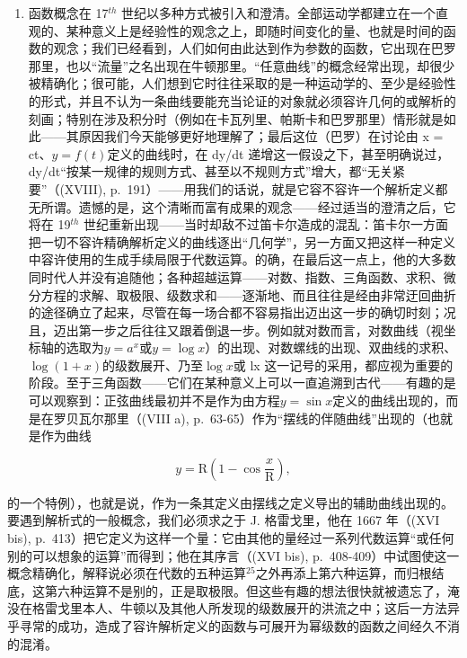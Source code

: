 \begin{enumerate}
\def\labelenumi{\Alph{enumi})}
\setcounter{enumi}{6}
\tightlist
\item
  函数概念在 17\(^{th}\) 世纪以多种方式被引入和澄清。全部运动学都建立在一个直观的、某种意义上是经验性的观念之上，即随时间变化的量、也就是时间的函数的观念；我们已经看到，人们如何由此达到作为参数的函数，它出现在巴罗那里，也以“流量”之名出现在牛顿那里。“任意曲线”的概念经常出现，却很少被精确化；很可能，人们想到它时往往采取的是一种运动学的、至少是经验性的形式，并且不认为一条曲线要能充当论证的对象就必须容许几何的或解析的刻画；特别在涉及积分时（例如在卡瓦列里、帕斯卡和巴罗那里）情形就是如此——其原因我们今天能够更好地理解了；最后这位（巴罗）在讨论由 x = ct、\(y = f(t)\)定义的曲线时，在 dy/dt 递增这一假设之下，甚至明确说过，dy/dt“按某一规律的规则方式、甚至以不规则方式”增大，都“无关紧要”（(XVIII), p.~191）——用我们的话说，就是它容不容许一个解析定义都无所谓。遗憾的是，这个清晰而富有成果的观念——经过适当的澄清之后，它将在 19\(^{th}\) 世纪重新出现——当时却敌不过笛卡尔造成的混乱：笛卡尔一方面把一切不容许精确解析定义的曲线逐出“几何学”，另一方面又把这样一种定义中容许使用的生成手续局限于代数运算。的确，在最后这一点上，他的大多数同时代人并没有追随他；各种超越运算——对数、指数、三角函数、求积、微分方程的求解、取极限、级数求和——逐渐地、而且往往是经由非常迂回曲折的途径确立了起来，尽管在每一场合都不容易指出迈出这一步的确切时刻；况且，迈出第一步之后往往又跟着倒退一步。例如就对数而言，对数曲线（视坐标轴的选取为\(y = a^{x}\)或\(y = \log x\)）的出现、对数螺线的出现、双曲线的求积、\(\log(1+x)\)的级数展开、乃至\(\log x\)或 lx 这一记号的采用，都应视为重要的阶段。至于三角函数——它们在某种意义上可以一直追溯到古代——有趣的是可以观察到：正弦曲线最初并不是作为由方程\(y = \sin x\)定义的曲线出现的，而是在罗贝瓦尔那里（(VIII a), p.~63-65）作为“摆线的伴随曲线”出现的（也就是作为曲线
\end{enumerate}

\[
y = \mathrm{R} \left(1 - \cos {\frac {x}{\mathrm{R}}}\right),
\]

的一个特例），也就是说，作为一条其定义由摆线之定义导出的辅助曲线出现的。要遇到解析式的一般概念，我们必须求之于 J. 格雷戈里，他在 1667 年（(XVI bis), p.~413）把它定义为这样一个量：它由其他的量经过一系列代数运算“或任何别的可以想象的运算”而得到；他在其序言（(XVI bis), p.~408-409）中试图使这一概念精确化，解释说必须在代数的五种运算\(^{25}\)之外再添上第六种运算，而归根结底，这第六种运算不是别的，正是取极限。但这些有趣的想法很快就被遗忘了，淹没在格雷戈里本人、牛顿以及其他人所发现的级数展开的洪流之中；这后一方法异乎寻常的成功，造成了容许解析定义的函数与可展开为幂级数的函数之间经久不消的混淆。

